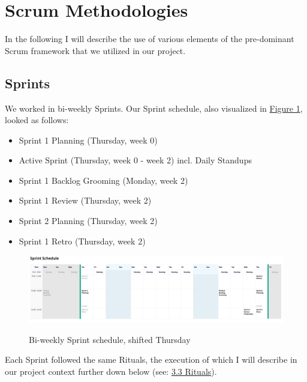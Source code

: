 \documentclass[a4paper]{article}
\begin{document}
\section{Scrum Methodologies}
In the following I will describe the use of various elements of the pre-dominant Scrum framework that we utilized in our project.
\subsection{Sprints}
\label{sec:sprints}
We worked in bi-weekly Sprints. Our Sprint schedule, also visualized in \hyperref[fig:schedule]{Figure 1}, looked as follows:
\begin{itemize}
\item Sprint 1 Planning (Thursday, week 0)
    \item Active Sprint (Thursday, week 0 - week 2) incl. Daily Standups
    \item Sprint 1 Backlog Grooming (Monday, week 2)
    \item Sprint 1 Review (Thursday, week 2)
    \item Sprint 2 Planning  (Thursday, week 2)
\item Sprint 1 Retro (Thursday, week 2)
\end{itemize}
\begin{figure}[h]
    \centering
    \includegraphics[width=1\textwidth \centering]{sprintschedule.jpeg}
    \label{fig:schedule}
    \caption{Bi-weekly Sprint schedule, shifted Thursday}
\end{figure}
Each Sprint followed the same Rituals, the execution of which I will describe in our project context further down below (see: \hyperref[sec:rituals]{3.3 Rituals}).
\end{document}
